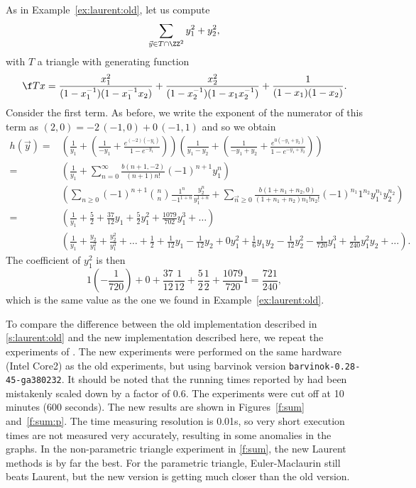 \begin{example}
As in Example~\ref{ex:laurent:old}, let us compute
$$
\sum_{\vec y \in T\cap \ZZ^2} y_1^2 + y_2^2
,
$$
with $T$ a triangle with generating function
$$
\f T x =
\frac{x_1^2}{(1-x_1^{-1})(1-x_1^{-1}x_2)}
+
\frac{x_2^2}{(1-x_2^{-1})(1-x_1 x_2^{-1})}
+
\frac1{(1-x_1)(1-x_2)}
.
$$
Consider the first term.  As before, we write the exponent of
the numerator of this term as
$(2,0) = -2 \, (-1,0) + 0 \, (-1, 1)$ and so we obtain
\begin{align*}
h(\vec y)
=&
\left(
\frac 1{y_1}
+ \left(
\frac 1{-y_1}
+
\frac {e^{(-2)(-y_1)}}{1-e^{-y_1}}
\right)
\right)
\left(
\frac 1{y_1-y_2}
+ \left(
\frac 1{-y_1+y_2}
+
\frac {e^{0(-y_1+y_2)}}{1-e^{-y_1+y_2}}
\right)
\right)
\\
=&
\left(
\frac 1 {y_1} + \sum_{n=0}^{\infty} \frac{b(n+1,-2)}{(n+1)n!} (-1)^{n+1} y_1^n
\right)
\\
&
\left(
\sum_{n\ge 0} (-1)^{n+1} {n \choose n} \frac {1^n}{{-1}^{1+n}}
					\frac {y_2^{n}}{y_1^{1+n}}
+ \sum_{\vec n \ge 0} \frac{b(1+n_1+n_2,0)}{(1+n_1+n_2)n_1!n_2!}
	(-1)^{n_1} 1^{n_2} y_1^{n_1} y_2^{n_2}
\right)
\\
=&
\left(
\frac 1 {y_1} + \frac 5 2 + \frac {37}{12} y_1 + \frac 5 2 y_1^2
+ \frac {1079}{702} y_1^3 + \ldots
\right)
\\
&
\left(
\frac 1 {y_1} + \frac {y_2}{y_1^2} + \frac {y_2^2}{y_1^3} + \ldots
+
\frac 1 2
+ \frac 1 {12} y_1
- \frac 1 {12} y_2
+ 0 y_1^2
+ \frac 1 6 y_1 y_2
- \frac 1 {12} y_2^2
- \frac 1 {720} y_1^3
+ \frac 1 {240} y_1^2 y_2
+ \ldots
\right)
.
\end{align*}
The coefficient of $y_1^2$ is then
$$
1(-\frac 1 {720}) + 0 + \frac{37}{12}\frac 1{12} + \frac 5 2\frac 1 2
+ \frac{1079}{720} 1 = \frac{721}{240}
,
$$
which is the same value as the one we found in
Example~\ref{ex:laurent:old}.
\end{example}

To compare the difference between the old implementation described
in \autoref{s:laurent:old} and the new implementation described here,
we repeat the experiments of .
The new experiments were performed on the same hardware (Intel Core2)
as the old experiments, but using barvinok version
{\tt barvinok-0.28-45-ga380232}.
It should be noted that the running times reported by
 had been mistakenly scaled down
by a factor of $0.6$.
The experiments were cut off at 10 minutes (600 seconds).
The new results are shown in Figures~\ref{f:sum} and~\ref{f:sum:p}.
The time measuring resolution is 0.01s, so very short execution times are not
measured very accurately, resulting in some anomalies in the graphs.
In the non-parametric triangle experiment in \autoref{f:sum},
the new Laurent methods is by far the best.
For the parametric triangle, Euler-Maclaurin still beats Laurent,
but the new version is getting much closer than the old version.

